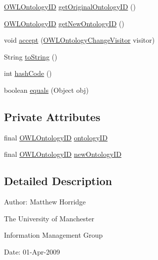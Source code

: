 \begin{DoxyCompactItemize}
\item 
\hyperlink{classorg_1_1semanticweb_1_1owlapi_1_1model_1_1_o_w_l_ontology_i_d}{O\-W\-L\-Ontology\-I\-D} \hyperlink{classorg_1_1semanticweb_1_1owlapi_1_1model_1_1_set_ontology_i_d_a0bb326fb1e27e87e82707ef565dd99ef}{get\-Original\-Ontology\-I\-D} ()
\item 
\hyperlink{classorg_1_1semanticweb_1_1owlapi_1_1model_1_1_o_w_l_ontology_i_d}{O\-W\-L\-Ontology\-I\-D} \hyperlink{classorg_1_1semanticweb_1_1owlapi_1_1model_1_1_set_ontology_i_d_a50e6c59dd8f8bb84f600a9c1666632a0}{get\-New\-Ontology\-I\-D} ()
\item 
void \hyperlink{classorg_1_1semanticweb_1_1owlapi_1_1model_1_1_set_ontology_i_d_a1ef505a4e0cff61c34d9400d26c9ad91}{accept} (\hyperlink{interfaceorg_1_1semanticweb_1_1owlapi_1_1model_1_1_o_w_l_ontology_change_visitor}{O\-W\-L\-Ontology\-Change\-Visitor} visitor)
\item 
String \hyperlink{classorg_1_1semanticweb_1_1owlapi_1_1model_1_1_set_ontology_i_d_a565d643e2c0a1f7f1bd72e99ab5ebc56}{to\-String} ()
\item 
int \hyperlink{classorg_1_1semanticweb_1_1owlapi_1_1model_1_1_set_ontology_i_d_ad9816655ffd0b0cea63ea8d89c75afdb}{hash\-Code} ()
\item 
boolean \hyperlink{classorg_1_1semanticweb_1_1owlapi_1_1model_1_1_set_ontology_i_d_a2fcd6ff082c473c196f23683b0ddbc3e}{equals} (Object obj)
\end{DoxyCompactItemize}
\subsection*{Private Attributes}
\begin{DoxyCompactItemize}
\item 
final \hyperlink{classorg_1_1semanticweb_1_1owlapi_1_1model_1_1_o_w_l_ontology_i_d}{O\-W\-L\-Ontology\-I\-D} \hyperlink{classorg_1_1semanticweb_1_1owlapi_1_1model_1_1_set_ontology_i_d_a632351a7e9ea2b61edc290f5c2adf57f}{ontology\-I\-D}
\item 
final \hyperlink{classorg_1_1semanticweb_1_1owlapi_1_1model_1_1_o_w_l_ontology_i_d}{O\-W\-L\-Ontology\-I\-D} \hyperlink{classorg_1_1semanticweb_1_1owlapi_1_1model_1_1_set_ontology_i_d_af8ef5904a434fd37de0b1ffc71423ae1}{new\-Ontology\-I\-D}
\end{DoxyCompactItemize}


\subsection{Detailed Description}
Author\-: Matthew Horridge\par
 The University of Manchester\par
 Information Management Group\par
 Date\-: 01-\/\-Apr-\/2009 

